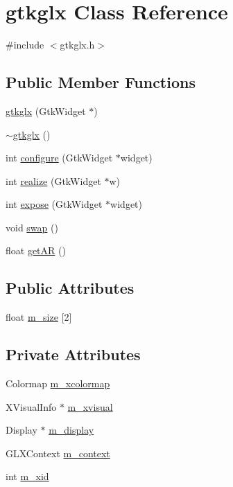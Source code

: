 \hypertarget{classgtkglx}{\section{gtkglx Class Reference}
\label{classgtkglx}
}


{\ttfamily \#include $<$gtkglx.\-h$>$}

\subsection*{Public Member Functions}
\begin{DoxyCompactItemize}
\item 
\hyperlink{classgtkglx_a466316a878562ed330bba63739c167f2}{gtkglx} (Gtk\-Widget $\ast$)
\item 
\hyperlink{classgtkglx_ae5c2798d5e61ded87faf7f64eeb80817}{$\sim$gtkglx} ()
\item 
int \hyperlink{classgtkglx_a7c1ed74e5151891a564b88ad017f9d37}{configure} (Gtk\-Widget $\ast$widget)
\item 
int \hyperlink{classgtkglx_ae7920db72a5a58789c41e037a462cb0d}{realize} (Gtk\-Widget $\ast$w)
\item 
int \hyperlink{classgtkglx_aa9149979541872ebf76816e358252b0c}{expose} (Gtk\-Widget $\ast$widget)
\item 
void \hyperlink{classgtkglx_ab3a79bf6884613c53fdfe1d1ff85f5fb}{swap} ()
\item 
float \hyperlink{classgtkglx_a38456e81eaf2b5faf13c7b21bb25550f}{get\-A\-R} ()
\end{DoxyCompactItemize}
\subsection*{Public Attributes}
\begin{DoxyCompactItemize}
\item 
float \hyperlink{classgtkglx_adc8e4c608f2155e31f57c7fa3fc14b95}{m\-\_\-size} \mbox{[}2\mbox{]}
\end{DoxyCompactItemize}
\subsection*{Private Attributes}
\begin{DoxyCompactItemize}
\item 
Colormap \hyperlink{classgtkglx_ac108b45171caa142d9b4c86e6bfbf9ba}{m\-\_\-xcolormap}
\item 
X\-Visual\-Info $\ast$ \hyperlink{classgtkglx_a5dd470218fb7d409a0b0d8bd9a1254ed}{m\-\_\-xvisual}
\item 
Display $\ast$ \hyperlink{classgtkglx_aada986b1fb66264f477245e3a0791298}{m\-\_\-display}
\item 
G\-L\-X\-Context \hyperlink{classgtkglx_a326f6d30a3a49d14ace94463e35f9018}{m\-\_\-context}
\item 
int \hyperlink{classgtkglx_aa75078fd3221c2f5f04421110f9aeb23}{m\-\_\-xid}
\end{DoxyCompactItemize}


